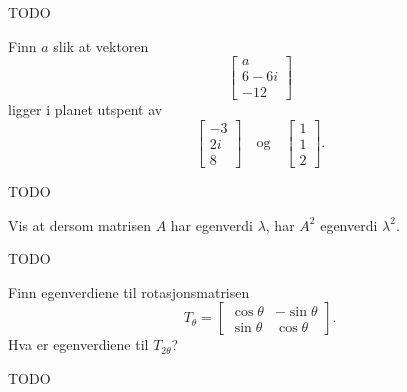 \begin{losning}
TODO
\end{losning}


\begin{oppgave}
Finn $a$ slik at vektoren 
\[
\begin{bmatrix}
a \\ 6-6i \\ -12 
\end{bmatrix}
\]
ligger i planet utspent av 
\[
\begin{bmatrix}
-3 \\ 2i \\ 8 
\end{bmatrix}
\quad 
\text{og}
\quad 
\begin{bmatrix}
1 \\ 1 \\ 2 
\end{bmatrix}.
\]

\end{oppgave}


\begin{losning}
TODO
\end{losning}


%

\begin{oppgave}
Vis at dersom matrisen $A$ har egenverdi $\lambda$, har $A^2$ egenverdi $\lambda^2$.
\end{oppgave}


\begin{losning}
TODO
\end{losning}

\begin{oppgave}
Finn egenverdiene til rotasjonsmatrisen
\[
T_{\theta}=
\begin{bmatrix}
\cos \theta & -\sin \theta  \\ \sin \theta & \cos \theta  
\end{bmatrix}.
\]
Hva er egenverdiene til $T_{2 \theta}$?
\end{oppgave}


\begin{losning}
TODO
\end{losning}



